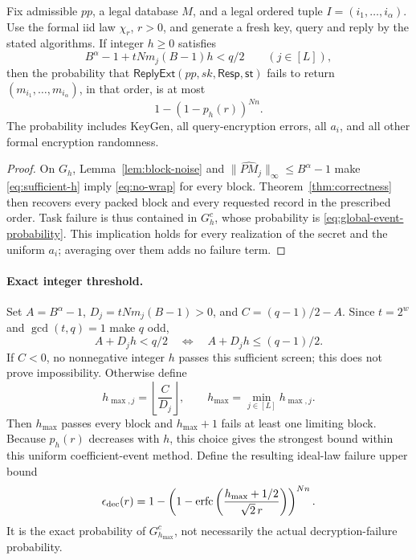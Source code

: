 \begin{proposition}
\label{prop:full-task-correctness}
Fix admissible \(pp\), a legal database \(M\), and a legal ordered tuple
\(I=(i_1,\ldots,i_\alpha)\). Use the formal iid law \(\chi_r\), \(r>0\),
and generate a fresh key, query and reply by the stated algorithms.
If integer \(h\ge0\) satisfies
\begin{equation}
\label{eq:sufficient-h}
 B^\alpha-1+tN m_j(B-1)h<q/2\qquad(j\in[L]),
\end{equation}
then the probability that \(\mathsf{ReplyExt}(pp,sk,\mathsf{Resp},\mathsf{st})\)
fails to return \((m_{i_1},\ldots,m_{i_\alpha})\), in that order, is at most
\[
 1-(1-p_h(r))^{Nn}.
\]
The probability includes KeyGen, all query-encryption errors, all \(a_i\),
and all other formal encryption randomness.
\end{proposition}
\begin{proof}
On \(G_h\), Lemma~\ref{lem:block-noise} and
\(\|\widehat{PM}_j\|_\infty\le B^\alpha-1\) make
\eqref{eq:sufficient-h} imply \eqref{eq:no-wrap} for every block.
Theorem~\ref{thm:correctness} then recovers every packed block and every
requested record in the prescribed order. Task failure is thus contained
in \(G_h^c\), whose probability is \eqref{eq:global-event-probability}.
This implication holds for every realization of the secret and the
uniform \(a_i\); averaging over them adds no failure term.
\end{proof}

\paragraph{Exact integer threshold.}
Set \(A=B^\alpha-1\), \(D_j=tN m_j(B-1)>0\), and
\(C=(q-1)/2-A\). Since \(t=2^w\) and \(\gcd(t,q)=1\) make \(q\) odd,
\[
 A+D_jh<q/2\quad\Longleftrightarrow\quad A+D_jh\le(q-1)/2.
\]
If \(C<0\), no nonnegative integer \(h\) passes this sufficient screen;
this does not prove impossibility. Otherwise define
\begin{equation}
\label{eq:hmax}
 h_{\max,j}=\left\lfloor\frac{C}{D_j}\right\rfloor,\qquad
 h_{\max}=\min_{j\in[L]}h_{\max,j}.
\end{equation}
Then \(h_{\max}\) passes every block and \(h_{\max}+1\) fails at least
one limiting block. Because \(p_h(r)\) decreases with \(h\), this choice
gives the strongest bound within this uniform coefficient-event method.
Define the resulting ideal-law failure upper bound
\begin{equation}
\label{eq:epsilon-dec}
 \epsilon_{\rm dec}(r)
 =1-\left(1-\operatorname{erfc}
 \left(\frac{h_{\max}+1/2}{\sqrt2\,r}\right)\right)^{Nn}.
\end{equation}
It is the exact probability of \(G_{h_{\max}}^c\), not necessarily the
actual decryption-failure probability.

